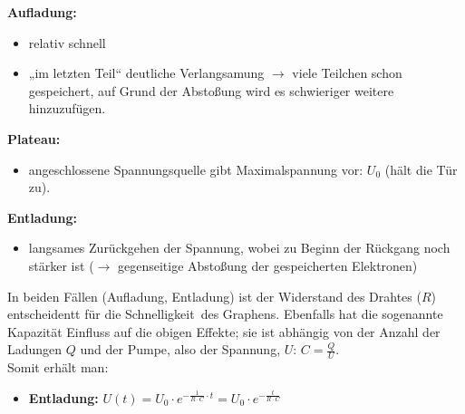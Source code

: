 \documentclass{report}
\begin{document}
	\newpage
	\noindent
	\textbf{Aufladung:}
	\begin{itemize}
		\item relativ schnell
		\item „im letzten Teil“ deutliche Verlangsamung
$\to$ viele Teilchen schon gespeichert, auf Grund der Abstoßung wird es schwieriger weitere hinzuzufügen.
	\end{itemize}
	\textbf{Plateau:}
	\begin{itemize}
		\item angeschlossene Spannungsquelle gibt Maximalspannung vor: $U_0$ (\dq hält die Tür zu\dq ).
	\end{itemize}
	\textbf{Entladung:}
	\begin{itemize}
		\item langsames Zurückgehen der Spannung, wobei zu Beginn der Rückgang noch stärker ist ($\to$ gegenseitige Abstoßung der gespeicherten Elektronen)
	\end{itemize}
	\vspace{1cm}
	In beiden Fällen (Aufladung, Entladung) ist der Widerstand des Drahtes ($R$) entscheidentt für die \dq Schnelligkeit\dq\ des Graphens.
	Ebenfalls hat die sogenannte Kapazität Einfluss auf die obigen Effekte; sie ist abhängig von der Anzahl der Ladungen $Q$ und der \dq Pumpe\dq, also der Spannung, $U$: $C = \frac{Q}{U}$.
	\\
	Somit erhält man:
	\begin{itemize}
		\item \textbf{Entladung:} $U(t) = U_0 \cdot e^{-\frac{1}{R\cdot C} \cdot t} = U_0 \cdot e^{-\frac{t}{R\cdot C}}$
	\end{itemize}
	
	
\end{document}
